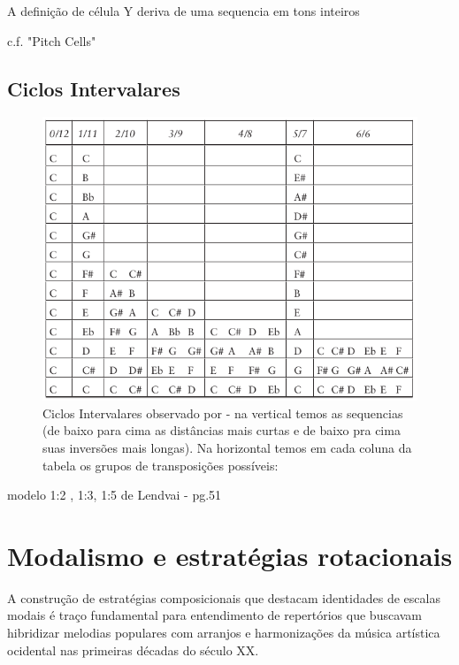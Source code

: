 \documentclass[
	12pt,				%
	openright,			%
	twoside,			%
	a4paper,			%
	english,			%
	french,				%
	spanish,			%
	brazil				%
	]{abntex2}
\begin{document}
A definição de célula Y deriva de uma sequencia em tons inteiros


c.f. "Pitch Cells"
\cite[p.130]{susanni_antokoletz2012music}


\subsection{Ciclos Intervalares}


\begin{figure}[!h]
	\caption{\label{fig_grafico}Ciclos Intervalares observado por  - na vertical temos as sequencias (de baixo para cima as distâncias mais curtas e de baixo pra cima suas inversões mais longas). Na horizontal temos em cada coluna da tabela os grupos de transposições possíveis: }
	\begin{center}
	    \includegraphics[scale=0.6]{antokoletz/ciclos_intervalares_table2012.png}
	\end{center}
\end{figure}



modelo 1:2 , 1:3, 1:5 de Lendvai - pg.51


\section{Modalismo e estratégias rotacionais}

A construção de estratégias composicionais que destacam identidades de escalas modais é traço fundamental para entendimento de repertórios que buscavam hibridizar melodias populares com arranjos e harmonizações da música artística ocidental nas primeiras décadas do século XX. 
\end{document}
